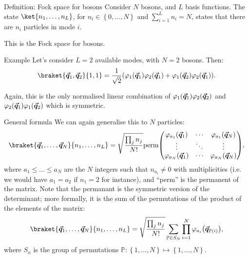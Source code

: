\documentclass[a4paper]{article}
\begin{document}
\begin{parag}{Definition: Fock space for bosons}
    Consider $N$ bosons, and $L$ basis functions. The state $\ket{n_1, \ldots, n_L}$, for $n_i \in \left\{0, \ldots, N\right\}$ and $\sum_{i=1}^{L} n_i = N$, states that there are $n_i$ particles in mode $i$.

    This is the Fock space for bosons.

    \begin{subparag}{Example}
        Let's consider $L = 2$ available modes, with $N = 2$ bosons. Then:
        \[\braket{\bvec{q}_1,\bvec{q}_2}{1, 1} = \frac{1}{\sqrt{2}} \left(\phi_1\left(\bvec{q}_1\right) \phi_2\left(\bvec{q}_1\right) + \phi_1\left(\bvec{q}_2\right) \phi_2\left(\bvec{q}_1\right)\right).\]

        Again, this is the only normalised linear combination of $\phi_1\left(\bvec{q}_1\right) \phi_2\left(\bvec{q}_2\right)$ and $\phi_2\left(\bvec{q}_1\right) \phi_1\left(\bvec{q}_2\right)$ which is symmetric.
    \end{subparag}

    \begin{subparag}{General formula}
        We can again generalise this to $N$ particles: 
        \[\braket{\bvec{q}_1,\ldots,\bvec{q}_N}{n_1, \ldots, n_L} = \sqrt{\frac{\prod_{j} n_j}{N!}} \text{perm}\begin{pmatrix} \phi_{a_1}\left(\bvec{q}_1\right) & \cdots & \phi_{a_1}\left(\bvec{q}_N\right) \\ \vdots & \ddots & \vdots \\ \phi_{a_N}\left(\bvec{q}_1\right) & \cdots & \phi_{a_N}\left(\bvec{q}_N\right) \end{pmatrix},\]
        where $a_1 \leq \ldots \leq a_N$ are the $N$ integers such that $n_{a_i} \neq 0$ with multiplicities (i.e. we would have $a_1 = a_2$ if $n_1 = 2$ for instance), and ``perm'' is the permanent of the matrix. Note that the permanant is the symmetric version of the determinant; more formally, it is the sum of the permutations of the product of the elements of the matrix:
        \[\braket{\bvec{q}_1,\ldots,\bvec{q}_N}{n_1, \ldots, n_L} = \sqrt{\frac{\prod_{j} n_j}{N!}} \sum_{\mathbb{P} \in S_N} \prod_{i=1}^{N} \phi_{a_i}\left(\bvec{q}_{\mathbb{P}\left(i\right)}\right),\]
        where $S_n$ is the group of permutations $\mathbb{P}: \left\{1, \ldots, N\right\} \mapsto \left\{1, \ldots, N\right\}$.
    \end{subparag}
\end{parag}
\end{document}
